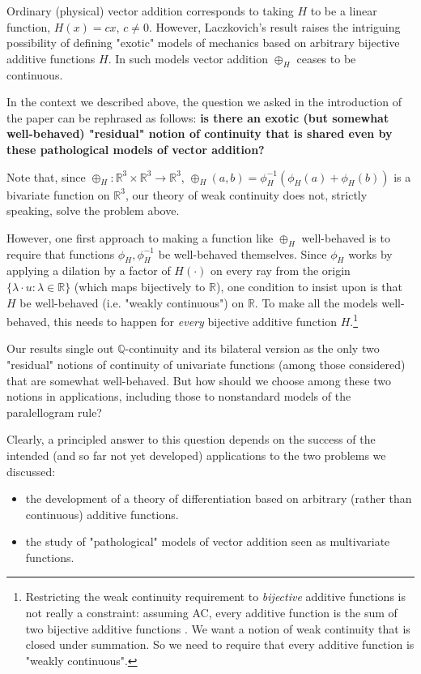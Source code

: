 \documentclass[11pt]{amsart} %
\theoremstyle{definition}
\newcommand{\R}{\mathbb{R}}
\newcommand{\Q}{\mathbb{Q}}
\begin{document}
Ordinary (physical) vector addition corresponds to taking $H$ to be a linear function, $H(x)=cx$, $c\neq 0$. However, Laczkovich's result raises the intriguing possibility of defining "exotic" models of mechanics based on arbitrary bijective additive functions $H$. In such models vector addition $\oplus_H$ ceases to be continuous. 

\begin{shaded} 
In the context we described above, the question we asked in the introduction of the paper can be rephrased as follows: \textbf{is there an exotic (but somewhat well-behaved) "residual" notion of continuity that is shared even by these pathological models of vector addition?} 
\end{shaded}

Note that, since $\oplus_{H}:\R^3\times \R^3\rightarrow \R^3$, $\oplus_{H}(a,b)=\phi_{H}^{-1}(\phi_{H}(a)+\phi_{H}(b))$ is a bivariate function on $\R^3$, our theory of weak continuity does not,  strictly speaking, solve the problem above. 

However, one first approach to making a function like $\oplus_{H}$ well-behaved is to require that functions $\phi_{H},\phi_{H}^{-1}$ be well-behaved themselves. Since $\phi_{H}$ works by applying a dilation by a factor of $H(\cdot)$ on every ray from the origin $\{\lambda\cdot u: \lambda\in \R\}$ (which maps bijectively to $\R$), one condition to insist upon is that $H$ be well-behaved (i.e. "weakly continuous") on $\R$. To make all the models well-behaved, this needs to happen for \emph{every} bijective additive function $H$.\footnote{Restricting the  weak continuity requirement to \emph{bijective} additive functions is not really a constraint: assuming AC, every additive function is the sum of two bijective additive functions \cite{40}. We want a notion of weak continuity that is closed under summation. So we need to require that every additive function is "weakly continuous".} 

Our results single out $\Q$-continuity and its bilateral version as the only two "residual" notions of continuity of univariate functions (among those considered) that are somewhat well-behaved. But how should we choose among these two notions in applications, including those to nonstandard models of the paralellogram rule?  

Clearly, a principled answer to this question depends on the success of the intended (and so far not yet developed) applications to the two problems we discussed: 
\begin{itemize} 
\item[-] the development of a theory of differentiation based on arbitrary (rather than continuous) additive functions.
\item[-] the study of "pathological" models of vector addition seen as multivariate functions. 
\end{itemize} 
\end{document}
